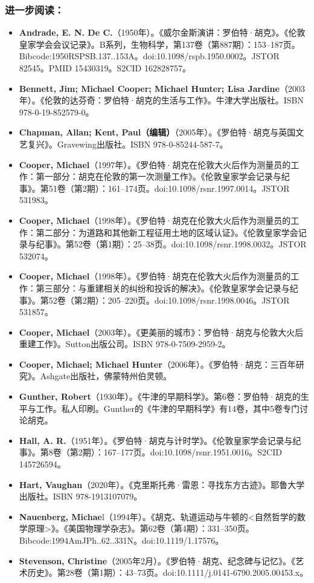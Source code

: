 \subsubsection{进一步阅读：}
\begin{itemize}
\item \textbf{Andrade, E. N. De C.}（1950年）。《威尔金斯演讲：罗伯特·胡克》。《伦敦皇家学会会议记录》。B系列，生物科学，第137卷（第887期）：153–187页。Bibcode:1950RSPSB.137..153A。doi:10.1098/rspb.1950.0002。JSTOR 82545。PMID 15430319。S2CID 162828757。
\item \textbf{Bennett, Jim; Michael Cooper; Michael Hunter; Lisa Jardine}（2003年）。《伦敦的达芬奇：罗伯特·胡克的生活与工作》。牛津大学出版社。ISBN 978-0-19-852579-0。
\item \textbf{Chapman, Allan; Kent, Paul（编辑）}（2005年）。《罗伯特·胡克与英国文艺复兴》。Gravewing出版社。ISBN 978-0-85244-587-7。
\item \textbf{Cooper, Michael}（1997年）。《罗伯特·胡克在伦敦大火后作为测量员的工作：第一部分：胡克在伦敦的第一次测量工作》。《伦敦皇家学会记录与纪事》。第51卷（第2期）：161–174页。doi:10.1098/rsnr.1997.0014。JSTOR 531983。
\item \textbf{Cooper, Michael}（1998年）。《罗伯特·胡克在伦敦大火后作为测量员的工作：第二部分：为道路和其他新工程征用土地的区域认证》。《伦敦皇家学会记录与纪事》。第52卷（第1期）：25–38页。doi:10.1098/rsnr.1998.0032。JSTOR 532074。
\item \textbf{Cooper, Michael}（1998年）。《罗伯特·胡克在伦敦大火后作为测量员的工作：第三部分：与重建相关的纠纷和投诉的解决》。《伦敦皇家学会记录与纪事》。第52卷（第2期）：205–220页。doi:10.1098/rsnr.1998.0046。JSTOR 531857。
\item \textbf{Cooper, Michael}（2003年）。《更美丽的城市》：罗伯特·胡克与伦敦大火后重建工作》。Sutton出版公司。ISBN 978-0-7509-2959-2。
\item \textbf{Cooper, Michael; Michael Hunter}（2006年）。《罗伯特·胡克：三百年研究》。Ashgate出版社，佛蒙特州伯灵顿。
\item \textbf{Gunther, Robert}（1930年）。《牛津的早期科学》。第6卷：罗伯特·胡克的生平与工作。私人印刷。Gunther的《牛津的早期科学》有14卷，其中5卷专门讨论胡克。
\item \textbf{Hall, A. R.}（1951年）。《罗伯特·胡克与计时学》。《伦敦皇家学会记录与纪事》。第8卷（第2期）：167–177页。doi:10.1098/rsnr.1951.0016。S2CID 145726594。
\item \textbf{Hart, Vaughan}（2020年）。《克里斯托弗·雷恩：寻找东方古迹》。耶鲁大学出版社。ISBN 978-1913107079。
\item \textbf{Nauenberg, Michae}l（1994年）。《胡克、轨道运动与牛顿的<自然哲学的数学原理>》。《美国物理学杂志》。第62卷（第4期）：331–350页。Bibcode:1994AmJPh..62..331N。doi:10.1119/1.17576。
\item \textbf{Stevenson, Christine}（2005年2月）。《罗伯特·胡克、纪念碑与记忆》。《艺术历史》。第28卷（第1期）：43–73页。doi:10.1111/j.0141-6790.2005.00453.x。
\end{itemize}
